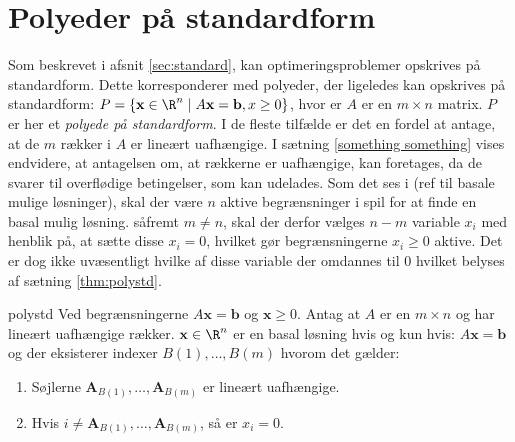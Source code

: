 \section{Polyeder på standardform}
\label{afsnit:fisk}
%
Som beskrevet i afsnit \ref{sec:standard}, kan optimeringsproblemer opskrives på standardform.
Dette korresponderer med polyeder, der ligeledes kan opskrives på standardform: 
$P=\{ \mathbf{x} \in \R^n \mid A\mathbf{x}=\mathbf{b},x \geq 0 \}$, hvor er $A$ er en $m \times n$ matrix.
$P$ er her et \textit{polyede på standardform}.
I de fleste tilfælde er det en fordel at antage, at de $m$ rækker i $A$ er lineært uafhængige.
I sætning \ref{something something} vises endvidere, at antagelsen om, at rækkerne er uafhængige, kan foretages, da de svarer til overflødige betingelser, som kan udelades.
Som det ses i (ref til basale mulige løsninger), skal der være $n$ aktive begrænsninger i spil for at finde en basal mulig løsning.
såfremt $m \neq n$, skal der derfor vælges $n-m$ variable $x_i$ med henblik på, at sætte disse $x_i=0$, hvilket gør begrænsningerne $x_i \geq 0$ aktive.
Det er dog ikke uvæsentligt hvilke af disse variable der omdannes til $0$ hvilket belyses af sætning \ref{thm:polystd}.
\begin{thm}{}{polystd}
Ved begrænsningerne $A\mathbf{x}=\mathbf{b}$ og $\mathbf{x}\geq 0$.
Antag at $A$ er en $m \times n$ og har lineært uafhængige rækker.
$\mathbf{x} \in \R^n$ er en basal løsning hvis og kun hvis: $A\mathbf{x}=\mathbf{b}$ og der eksisterer indexer $B(1),\ldots,B(m)$ hvorom det gælder:
\begin{enumerate}[label=(\alph*)]
\item Søjlerne $\mathbf{A}_{B(1)},\ldots,\mathbf{A}_{B(m)}$ er lineært uafhængige.
\item Hvis $i \neq \mathbf{A}_{B(1)},\ldots,\mathbf{A}_{B(m)}$, så er $x_i=0$.
\end{enumerate}
\end{thm}

